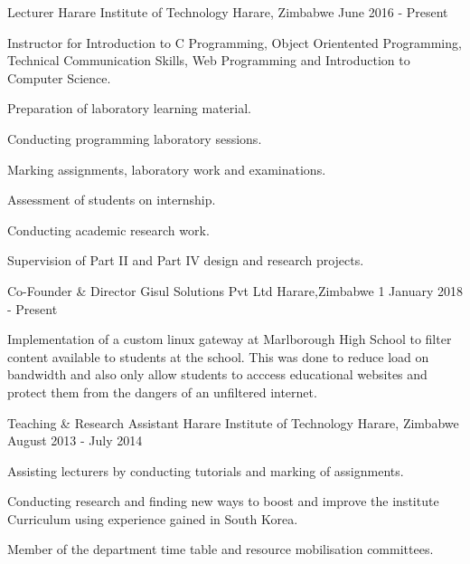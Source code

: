 \begin{cventries}
 \cventry
 {Lecturer} %
 {Harare Institute of Technology} %
 {Harare, Zimbabwe} %
 {June 2016 -  Present} %
 {
   \begin{cvitems} %
     \item {Instructor for Introduction to C Programming, Object Orientented Programming, Technical Communication Skills, Web Programming and Introduction to Computer Science.}
     \item {Preparation of laboratory learning material.}
     \item {Conducting programming laboratory sessions.}
     \item {Marking assignments, laboratory work and examinations.}
     \item {Assessment of students on internship.}
     \item {Conducting academic research work.}
     \item {Supervision of Part II and Part IV design and research projects.}
   \end{cvitems}
 }   

  \cventry
    {Co-Founder \& Director} %
    {Gisul Solutions Pvt Ltd} %
    {Harare,Zimbabwe} %
    {1 January 2018 - Present} %
    {
      \begin{cvitems} %
        \item {Implementation of a custom linux gateway at Marlborough High School to filter content available to students at the school. This was done to reduce load on bandwidth and also only allow students to acccess educational websites and protect them from the dangers of an unfiltered internet.}
      \end{cvitems}
    }

  \cventry
    {Teaching \& Research Assistant} %
    {Harare Institute of Technology} %
    {Harare, Zimbabwe} %
    {August 2013 - July 2014} %
    {
      \begin{cvitems} %
        \item {Assisting lecturers by conducting tutorials and marking of assignments.}
        \item {Conducting research and finding new ways to boost and improve the institute Curriculum using experience gained in South Korea.}
        \item {Member of the department time table and resource mobilisation committees.}
      \end{cvitems}
    }


\end{cventries}
